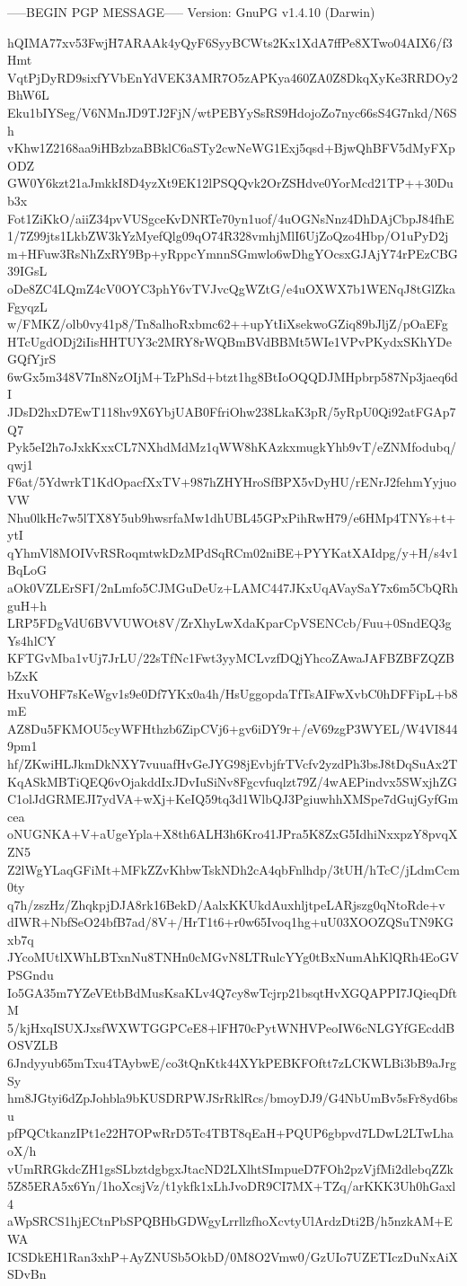-----BEGIN PGP MESSAGE-----
Version: GnuPG v1.4.10 (Darwin)

hQIMA77xv53FwjH7ARAAk4yQyF6SyyBCWts2Kx1XdA7ffPe8XTwo04AIX6/f3Hmt
VqtPjDyRD9sixfYVbEnYdVEK3AMR7O5zAPKya460ZA0Z8DkqXyKe3RRDOy2BhW6L
Eku1bIYSeg/V6NMnJD9TJ2FjN/wtPEBYySsRS9HdojoZo7nyc66sS4G7nkd/N6Sh
vKhw1Z2168aa9iHBzbzaBBklC6aSTy2cwNeWG1Exj5qsd+BjwQhBFV5dMyFXpODZ
GW0Y6kzt21aJmkkI8D4yzXt9EK12lPSQQvk2OrZSHdve0YorMcd21TP++30Dub3x
Fot1ZiKkO/aiiZ34pvVUSgceKvDNRTe70yn1uof/4uOGNsNnz4DhDAjCbpJ84fhE
1/7Z99jts1LkbZW3kYzMyefQlg09qO74R328vmhjMlI6UjZoQzo4Hbp/O1uPyD2j
m+HFuw3RsNhZxRY9Bp+yRppcYmnnSGmwlo6wDhgYOcsxGJAjY74rPEzCBG39IGsL
oDe8ZC4LQmZ4cV0OYC3phY6vTVJvcQgWZtG/e4uOXWX7b1WENqJ8tGlZkaFgyqzL
w/FMKZ/olb0vy41p8/Tn8alhoRxbmc62++upYtIiXsekwoGZiq89bJljZ/pOaEFg
HTcUgdODj2iIisHHTUY3c2MRY8rWQBmBVdBBMt5WIe1VPvPKydxSKhYDeGQfYjrS
6wGx5m348V7In8NzOIjM+TzPhSd+btzt1hg8BtIoOQQDJMHpbrp587Np3jaeq6dI
JDsD2hxD7EwT118hv9X6YbjUAB0FfriOhw238LkaK3pR/5yRpU0Qi92atFGAp7Q7
Pyk5eI2h7oJxkKxxCL7NXhdMdMz1qWW8hKAzkxmugkYhb9vT/eZNMfodubq/qwj1
F6at/5YdwrkT1KdOpacfXxTV+987hZHYHroSfBPX5vDyHU/rENrJ2fehmYyjuoVW
Nhu0lkHc7w5lTX8Y5ub9hwsrfaMw1dhUBL45GPxPihRwH79/e6HMp4TNYs+t+ytI
qYhmVl8MOIVvRSRoqmtwkDzMPdSqRCm02niBE+PYYKatXAIdpg/y+H/s4v1BqLoG
aOk0VZLErSFI/2nLmfo5CJMGuDeUz+LAMC447JKxUqAVaySaY7x6m5CbQRhguH+h
LRP5FDgVdU6BVVUWOt8V/ZrXhyLwXdaKparCpVSENCcb/Fuu+0SndEQ3gYs4hlCY
KFTGvMba1vUj7JrLU/22sTfNc1Fwt3yyMCLvzfDQjYhcoZAwaJAFBZBFZQZBbZxK
HxuVOHF7sKeWgv1s9e0Df7YKx0a4h/HsUggopdaTfTsAIFwXvbC0hDFFipL+b8mE
AZ8Du5FKMOU5cyWFHthzb6ZipCVj6+gv6iDY9r+/eV69zgP3WYEL/W4VI8449pm1
hf/ZKwiHLJkmDkNXY7vuuafHvGeJYG98jEvbjfrTVcfv2yzdPh3bsJ8tDqSuAx2T
KqASkMBTiQEQ6vOjakddIxJDvIuSiNv8Fgcvfuqlzt79Z/4wAEPindvx5SWxjhZG
C1olJdGRMEJI7ydVA+wXj+KeIQ59tq3d1WlbQJ3PgiuwhhXMSpe7dGujGyfGmcea
oNUGNKA+V+aUgeYpla+X8th6ALH3h6Kro41JPra5K8ZxG5IdhiNxxpzY8pvqXZN5
Z2lWgYLaqGFiMt+MFkZZvKhbwTskNDh2cA4qbFnlhdp/3tUH/hTcC/jLdmCcm0ty
q7h/zszHz/ZhqkpjDJA8rk16BekD/AalxKKUkdAuxhljtpeLARjszg0qNtoRde+v
dIWR+NbfSeO24bfB7ad/8V+/HrT1t6+r0w65Ivoq1hg+uU03XOOZQSuTN9KGxb7q
JYcoMUtlXWhLBTxnNu8TNHn0cMGvN8LTRulcYYg0tBxNumAhKlQRh4EoGVPSGndu
Io5GA35m7YZeVEtbBdMusKsaKLv4Q7cy8wTcjrp21bsqtHvXGQAPPI7JQieqDftM
5/kjHxqISUXJxsfWXWTGGPCeE8+lFH70cPytWNHVPeoIW6cNLGYfGEcddBOSVZLB
6Jndyyub65mTxu4TAybwE/co3tQnKtk44XYkPEBKFOftt7zLCKWLBi3bB9aJrgSy
hm8JGtyi6dZpJohbla9bKUSDRPWJSrRklRcs/bmoyDJ9/G4NbUmBv5sFr8yd6bsu
pfPQCtkanzIPt1e22H7OPwRrD5Tc4TBT8qEaH+PQUP6gbpvd7LDwL2LTwLhaoX/h
vUmRRGkdcZH1gsSLbztdgbgxJtacND2LXlhtSImpueD7FOh2pzVjfMi2dlebqZZk
5Z85ERA5x6Yn/1hoXcsjVz/t1ykfk1xLhJvoDR9CI7MX+TZq/arKKK3Uh0hGaxl4
aWpSRCS1hjECtnPbSPQBHbGDWgyLrrllzfhoXcvtyUlArdzDti2B/h5nzkAM+EWA
ICSDkEH1Ran3xhP+AyZNUSb5OkbD/0M8O2Vmw0/GzUIo7UZETIczDuNxAiXSDvBn
